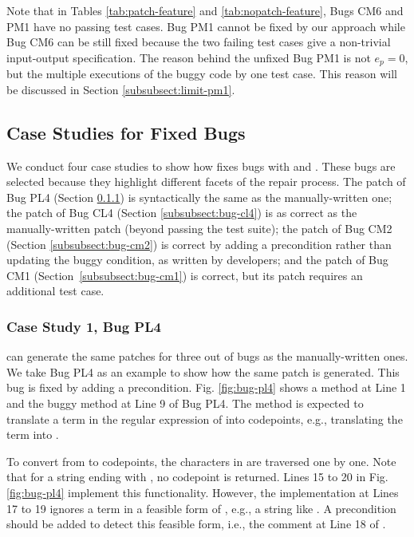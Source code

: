 Note that in Tables \ref{tab:patch-feature} and \ref{tab:nopatch-feature}, Bugs CM6 and PM1 have no passing test cases. Bug PM1 cannot be fixed by our approach while Bug CM6 can be still fixed because the two failing test cases give a non-trivial input-output specification.
The reason behind the unfixed Bug PM1 is not $e_p=0$, but the multiple executions of the buggy code by one test case. This reason will be discussed in Section \ref{subsubsect:limit-pm1}.

\subsection{Case Studies for Fixed Bugs}
\label{subsect:case-study-repair}

We conduct four case studies to show how \nopol fixes bugs with \buggyconditions and \preconditions. These bugs are selected because they highlight different facets of the repair process. The patch of Bug PL4 (Section \ref{subsubsect:bug-pl4}) is syntactically the same as the manually-written one; 
the patch of Bug CL4 (Section \ref{subsubsect:bug-cl4}) is as correct as the manually-written patch (beyond passing the test suite); 
the patch of Bug CM2 (Section \ref{subsubsect:bug-cm2}) is correct by adding a precondition rather than updating the buggy condition, as written by developers; 
and the patch of Bug CM1 (Section~\ref{subsubsect:bug-cm1}) is correct, but its patch requires an additional test case. 

\subsubsection{Case Study 1, Bug PL4}
\label{subsubsect:bug-pl4}

\nopol can generate the same patches for three out of \numbug bugs as the manually-written ones. 
We take Bug PL4 as an example to show how the same patch is generated. This bug is fixed by adding a precondition. Fig. \ref{fig:bug-pl4} shows a method  at Line 1 and the buggy method  at Line 9 of Bug PL4. The method  is expected to translate a term in the regular expression of  into codepoints, e.g., translating the term  into . 

To convert from  to codepoints, the characters in  are traversed one by one. Note that for a string ending with , no codepoint is returned. Lines 15 to 20 in Fig. \ref{fig:bug-pl4} implement this functionality. However, the implementation at Lines 17 to 19 ignores a term in a feasible form of , e.g., a string like . A precondition should be added to detect this feasible form, i.e., the comment at Line 18 of .

